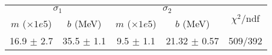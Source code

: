 \begin{tabular}{cc|cc||c}
\multicolumn{2}{c|}{$\sigma_1$} & \multicolumn{2}{|c}{$\sigma_2$}  & \multirow{2}{*}{$\chi^2/$ndf}\\
$m$ ($\times1e5$) & $b$ (MeV) & $m$ ($\times1e5$) & $b$ (MeV)  & \\
\hline
16.9 $\pm$ 2.7 & 35.5 $\pm$ 1.1 & 9.5 $\pm$ 1.1 & 21.32 $\pm$ 0.57 & 509/392\\
\end{tabular}
